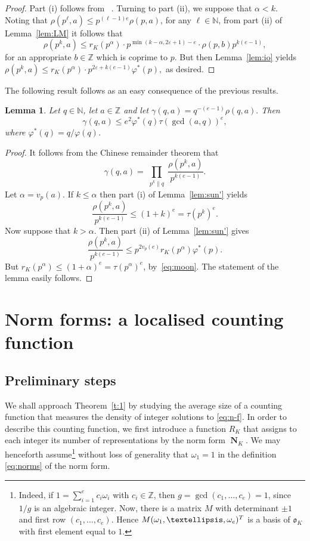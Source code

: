\documentclass[11pt,letterpaper]{amsart}
\renewcommand{\leq}{\leqslant}
\newtheorem{lemma}[theorem]{Lemma}
\theoremstyle{definition}
\numberwithin{equation}{section}
\newcommand\ZZ{\mathbb{Z}}
\newcommand\NN{\mathbb{N}}
\newcommand{\ve}{\varepsilon}
\DeclareMathOperator{\nf}{\mathbf{N}}
\newcommand{\0}{\mathbf{0}}
\begin{document}
\begin{proof}
Part (i) follows from  ~\cite[Eq.~(4.5)]{nf}. 
Turning to part (ii), we suppose that $\alpha<k$.
Noting that $\rho(p^\ell,a)\leq p^{(\ell-1) e}\rho(p,a)$, for any $\ell\in \NN$, from part (ii) of Lemma~\ref{lem:LM}  it follows that
$$
\rho(p^k,a) \leq r_K(p^\alpha) \cdot 
p^{\min(k-\alpha,2\ve+1)-e} \cdot
\rho(p,b) p^{k(e-1)},
$$
for an appropriate $b\in \ZZ$ which is coprime to $p$.
But then Lemma~\ref{lem:io} yields
 $
\rho(p^k,a) \leq 
r_K(p^\alpha) \cdot 
p^{2\ve +k(e-1)}\varphi^*(p),
$
as desired. 
\end{proof}


The following result follows as 
an easy consequence of the previous results. 

\begin{lemma}\label{lem:sun}
Let $q\in \NN$, let $a\in \ZZ$ and let $\gamma(q,a)=
q^{-(e-1)} \rho(q,a).$
Then 
$$
\gamma(q,a)\leq 
e^2 \varphi^*(q) \tau(\gcd(a,q))^e,
$$ 
where  $\varphi^*(q)=q/\varphi(q)$.
\end{lemma}

\begin{proof}
It follows from the Chinese remainder theorem that 
$$
\gamma(q,a)=
\prod_{\substack{p^k\|q}} 
\frac{\rho(p^k,a)}{p^{k(e-1)}}.
$$
Let $\alpha=v_p(a)$. If 
 $k\leq \alpha$ then part  (i) of Lemma~\ref{lem:sun'} yields
$$
 \frac{\rho(p^k,a)}{p^{k(e-1)}} \leq (1+k)^e=\tau(p^k)^e.
$$
Now suppose that $k>\alpha$.  Then 
part (ii) of Lemma~\ref{lem:sun'} gives
$$
 \frac{\rho(p^k,a)}{p^{k(e-1)}} \leq  p^{2v_p(e)}
  r_K(p^{\alpha})
\varphi^*(p).
$$
But $r_K(p^\alpha)\leq (1+\alpha)^e=\tau(p^\alpha)^e$, by~\eqref{eq:moon}.
The statement of the lemma easily follows.
\end{proof}

\section{Norm forms: a localised counting function}\label{sec:normforms}

\subsection{Preliminary steps}

We shall approach Theorem~\ref{t:1} by studying the average size of a counting function that measures the density of integer solutions to 
\eqref{eq:n-f}. 
In order to describe 
this counting function, we first introduce a function $R_K$ 
that assigns to each 
integer its number of representations by the norm form $\nf_K$. 
We may henceforth assume\footnote{Indeed, if $1=\sum_{i=1}^{e}c_i\omega_i$ with $c_i\in \mathbb{Z}$, then $g=\gcd(c_1,\ldots, c_e)=1$, since $1/g$ is an algebraic integer. Now, there is a matrix $M$ with determinant $\pm 1$ and first row $(c_1,\ldots, c_{e})$. Hence $M(\omega_1,\ldots, \omega_{e})^{\textnormal{T}}$ is a basis of $\mathfrak{o}_K$ with first element equal to $1$.} 
without loss of generality that $\omega_1=1$ in 
the definition \eqref{eq:norms} of the norm form. 
\end{document}
